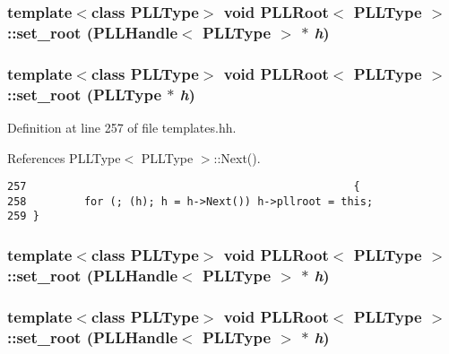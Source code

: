 \subsubsection{\setlength{\rightskip}{0pt plus 5cm}template$<$class PLLType$>$ void PLLRoot$<$ {\bf PLLType} $>$::set\_\-root ({\bf PLLHandle}$<$ {\bf PLLType} $>$ $\ast$ {\em h})\hspace{0.3cm}{\tt  [inline, protected]}}\label{classPLLRoot_b3}


\subsubsection{\setlength{\rightskip}{0pt plus 5cm}template$<$class PLLType$>$ void PLLRoot$<$ {\bf PLLType} $>$::set\_\-root ({\bf PLLType} $\ast$ {\em h})\hspace{0.3cm}{\tt  [inline, protected]}}\label{classPLLRoot_b2}




Definition at line 257 of file templates.hh.

References PLLType$<$ PLLType $>$::Next().



\footnotesize\begin{verbatim}257                                                   { 
258         for (; (h); h = h->Next()) h->pllroot = this; 
259 } 
\end{verbatim}\normalsize 
{}
\subsubsection{\setlength{\rightskip}{0pt plus 5cm}template$<$class PLLType$>$ void PLLRoot$<$ {\bf PLLType} $>$::set\_\-root ({\bf PLLHandle}$<$ {\bf PLLType} $>$ $\ast$ {\em h})\hspace{0.3cm}{\tt  [inline, protected]}}\label{classPLLRoot_b1}


\subsubsection{\setlength{\rightskip}{0pt plus 5cm}template$<$class PLLType$>$ void PLLRoot$<$ {\bf PLLType} $>$::set\_\-root ({\bf PLLHandle}$<$ {\bf PLLType} $>$ $\ast$ {\em h})\hspace{0.3cm}{\tt  [inline, protected]}}\label{classPLLRoot_b0}




